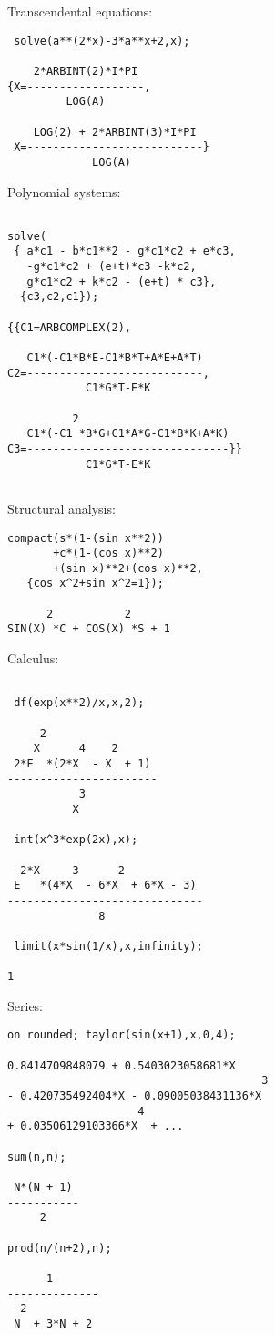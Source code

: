 Transcendental equations:
\begin{verbatim} 
 solve(a**(2*x)-3*a**x+2,x);

    2*ARBINT(2)*I*PI
{X=------------------,
         LOG(A)

    LOG(2) + 2*ARBINT(3)*I*PI
 X=---------------------------}
             LOG(A)

\end{verbatim}
Polynomial systems:
\begin{verbatim}

solve(
 { a*c1 - b*c1**2 - g*c1*c2 + e*c3,
   -g*c1*c2 + (e+t)*c3 -k*c2,
   g*c1*c2 + k*c2 - (e+t) * c3},
  {c3,c2,c1});

{{C1=ARBCOMPLEX(2),

   C1*(-C1*B*E-C1*B*T+A*E+A*T)
C2=---------------------------,
            C1*G*T-E*K

          2
   C1*(-C1 *B*G+C1*A*G-C1*B*K+A*K)
C3=-------------------------------}}
            C1*G*T-E*K


\end{verbatim}
Structural analysis:
\begin{verbatim}
compact(s*(1-(sin x**2))
       +c*(1-(cos x)**2)
       +(sin x)**2+(cos x)**2,
   {cos x^2+sin x^2=1});

      2           2
SIN(X) *C + COS(X) *S + 1

\end{verbatim}
Calculus:
\begin{verbatim}
 
 df(exp(x**2)/x,x,2);

     2
    X      4    2
 2*E  *(2*X  - X  + 1)
-----------------------
           3
          X

 int(x^3*exp(2x),x);

  2*X     3      2
 E   *(4*X  - 6*X  + 6*X - 3)
------------------------------
              8

 limit(x*sin(1/x),x,infinity);

1
\end{verbatim}
Series:
\begin{verbatim}
on rounded; taylor(sin(x+1),x,0,4);

0.8414709848079 + 0.5403023058681*X
                                       3
- 0.420735492404*X - 0.09005038431136*X  
                    4
+ 0.03506129103366*X  + ...

sum(n,n);

 N*(N + 1)
-----------
     2

prod(n/(n+2),n);

      1
--------------
  2
 N  + 3*N + 2
\end{verbatim}
